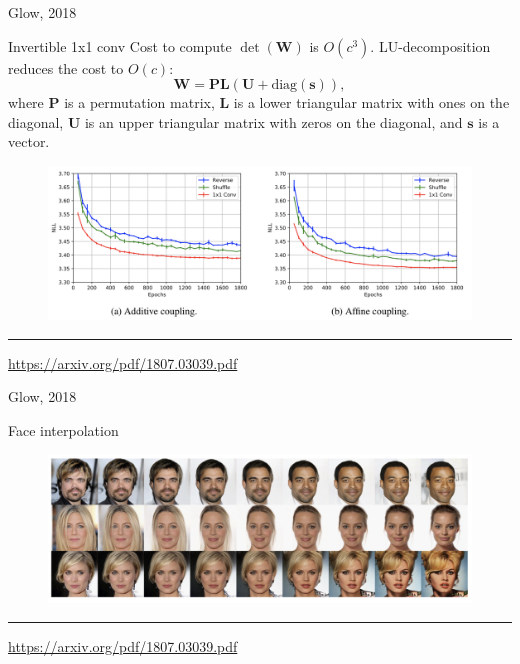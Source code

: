 \documentclass{beamer}
\begin{document}
\begin{frame}{Glow, 2018}
	\begin{block}{Invertible 1x1 conv}
		Cost to compute $\det (\mathbf{W})$ is $O(c^3)$. 
		LU-decomposition reduces the cost to $O(c)$:
		\[
		\mathbf{W} = \mathbf{P}\mathbf{L}(\mathbf{U} + \text{diag}(\mathbf{s})),
		\]
		where $\mathbf{P}$ is a permutation matrix, $\mathbf{L}$ is a lower triangular matrix with ones on the diagonal, $\mathbf{U}$ is an
		upper triangular matrix with zeros on the diagonal, and $\mathbf{s}$ is a vector.
	\end{block}
	\begin{figure}
		\centering
		\includegraphics[width=\linewidth]{figs/glow_1x1_conv.png}
	\end{figure}
	\vfill
	\hrule\medskip
	{\scriptsize \href{https://arxiv.org/pdf/1807.03039.pdf}{https://arxiv.org/pdf/1807.03039.pdf}}    
\end{frame}
\begin{frame}{Glow, 2018}
	\begin{block}{Face interpolation}
		\begin{figure}
			\centering
			\includegraphics[width=\linewidth]{figs/glow_interpolation.png}
		\end{figure}
	\end{block}
	\vfill
	\hrule\medskip
	{\scriptsize \href{https://arxiv.org/pdf/1807.03039.pdf}{https://arxiv.org/pdf/1807.03039.pdf}}   
\end{frame}
\end{document}
